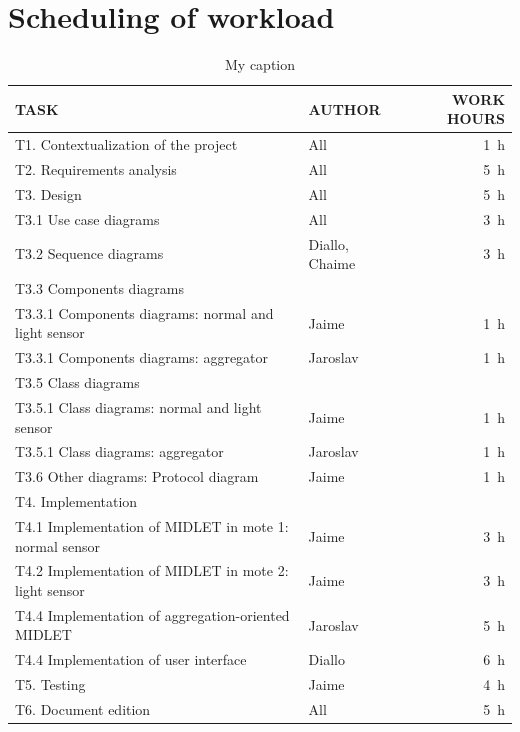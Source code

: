 \documentclass[UKenglish,10pt,a4paper]{report}
\begin{document}
\chapter{Scheduling of workload}
\begin{table}[]
	\centering
	\caption{My caption}
	\label{my-label}
	\begin{tabu}{llr}
		\toprule[2pt]
		TASK                                                   & AUTHOR         & WORK HOURS \\ \midrule
		T1. Contextualization of the project                   & All            & \SI{1}{\hour}  \\
		T2. Requirements analysis                              & All            & \SI{5}{\hour}  \\
		T3. Design                                             & All            & \SI{5}{\hour}  \\ \midrule
		T3.1 Use case diagrams                                 & All            & \SI{3}{\hour}  \\
		T3.2 Sequence diagrams                                 & Diallo, Chaime & \SI{3}{\hour}  \\
		T3.3 Components diagrams                               &                &            \\
		T3.3.1 Components diagrams: normal and light sensor    & Jaime          & \SI{1}{\hour}   \\
		T3.3.1 Components diagrams: aggregator                 & Jaroslav       & \SI{1}{\hour}   \\
		T3.5 Class diagrams                                    &                &            \\
		T3.5.1 Class diagrams: normal and light sensor         & Jaime          & \SI{1}{\hour}   \\
		T3.5.1 Class diagrams: aggregator                      & Jaroslav       & \SI{1}{\hour}   \\
		T3.6 Other diagrams: Protocol diagram                  & Jaime          & \SI{1}{\hour}   \\
		T4. Implementation                                     &                &            \\ \midrule
		T4.1 Implementation of MIDLET in mote 1: normal sensor & Jaime          & \SI{3}{\hour}   \\
		T4.2 Implementation of MIDLET in mote 2: light sensor  & Jaime          & \SI{3}{\hour}   \\
		T4.4 Implementation of aggregation-oriented MIDLET     & Jaroslav       & \SI{5}{\hour}   \\
		T4.4 Implementation of user interface                  & Diallo         & \SI{6}{\hour}   \\
		T5. Testing                                            & Jaime          & \SI{4}{\hour}    \\
		T6. Document edition                                   & All            & \SI{5}{\hour}    \\
		\bottomrule[2pt]
	\end{tabu}
\end{table}
\end{document}
